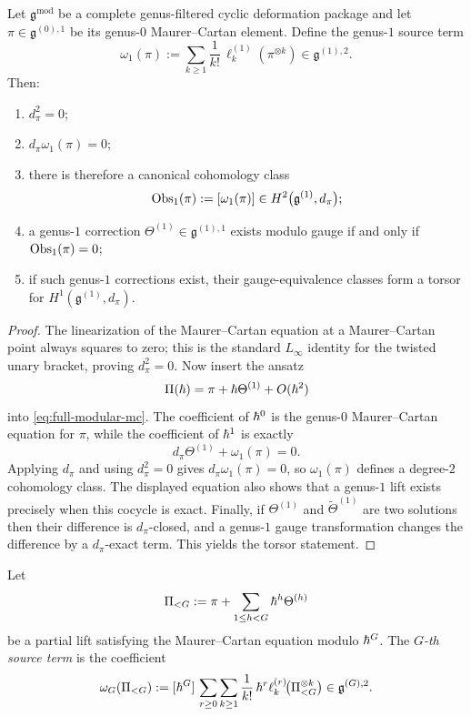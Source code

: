 \begin{theorem}
Let $\mathfrak g^{\mathrm{mod}}$ be a complete genus-filtered cyclic deformation package and let
$\pi\in \mathfrak g^{(0),1}$ be its genus-$0$ Maurer--Cartan element. Define the genus-$1$
source term
\begin{equation}
\omega_1(\pi):=\sum_{k\ge 1}\frac1{k!}\,\ell_k^{(1)}(\pi^{\otimes k})
\in \mathfrak g^{(1),2}.
\end{equation}
Then:
\begin{enumerate}[label=\textup{(\alph*)}]
\item $d_\pi^2=0$;
\item $d_\pi\omega_1(\pi)=0$;
\item there is therefore a canonical cohomology class
\[
\operatorname{Obs}_1(\pi):=[\omega_1(\pi)]
\in H^2\bigl(\mathfrak g^{(1)},d_\pi\bigr);
\]
\item a genus-$1$ correction $\Theta^{(1)}\in\mathfrak g^{(1),1}$ exists modulo gauge if and
only if $\operatorname{Obs}_1(\pi)=0$;
\item if such genus-$1$ corrections exist, their gauge-equivalence classes form a torsor for
$H^1(\mathfrak g^{(1)},d_\pi)$.
\end{enumerate}
\end{theorem}

\begin{proof}
The linearization of the Maurer--Cartan equation at a Maurer--Cartan point always squares to
zero; this is the standard $L_\infty$ identity for the twisted unary bracket, proving $d_\pi^2=0$.
Now insert the ansatz
\[
\Pi(\hbar)=\pi+\hbar\Theta^{(1)}+O(\hbar^2)
\]
into \eqref{eq:full-modular-mc}. The coefficient of $\hbar^0$ is the genus-$0$ Maurer--Cartan
equation for $\pi$, while the coefficient of $\hbar^1$ is exactly
\[
d_\pi\Theta^{(1)}+\omega_1(\pi)=0.
\]
Applying $d_\pi$ and using $d_\pi^2=0$ gives $d_\pi\omega_1(\pi)=0$, so
$\omega_1(\pi)$ defines a degree-$2$ cohomology class. The displayed equation also shows that
a genus-$1$ lift exists precisely when this cocycle is exact. Finally, if
$\Theta^{(1)}$ and $\widetilde\Theta^{(1)}$ are two solutions then their difference is
$d_\pi$-closed, and a genus-$1$ gauge transformation changes the difference by a
$d_\pi$-exact term. This yields the torsor statement.
\end{proof}

\begin{definition}
Let
\[
\Pi_{<G}:=\pi+\sum_{1\le h<G}\hbar^h\Theta^{(h)}
\]
be a partial lift satisfying the Maurer--Cartan equation modulo $\hbar^G$. The
\emph{$G$-th source term} is the coefficient
\begin{equation}
\omega_G(\Pi_{<G})
:=
[\hbar^G]\,
\sum_{r\ge 0}\sum_{k\ge 1}\frac1{k!}\,
\hbar^r\ell_k^{(r)}\!\bigl(\Pi_{<G}^{\otimes k}\bigr)
\in \mathfrak g^{(G),2}.
\end{equation}
\end{definition}

